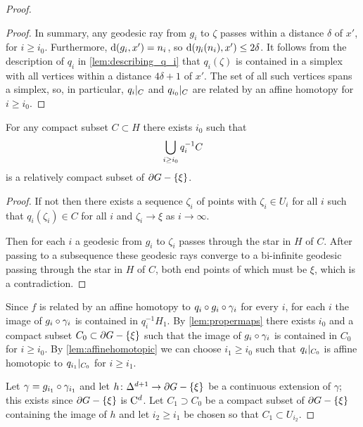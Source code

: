 \documentclass[a4paper]{article}
\begin{document}
\begin{proof}
\begin{proof}
  In summary, any geodesic ray from $g_i$ to $\zeta$ passes within a distance 
  $\delta$ of $x'$, for $i\geq i_0$. Furthermore, $\operatorname{d}(g_i,x') = n_i$, so 
  $\operatorname{d}(\eta_i(n_i), x')\leq 2\delta$. It follows from the description of
  $q_i$ in \cref{lem:describing_q_i} that $q_i(\zeta)$ is contained in a
  simplex with all vertices within a distance $4\delta+1$ of $x'$. The set of
  all such vertices spans a simplex, so, in particular, $q_i\vert_{C}$ and
  $q_{i_0}\vert_{C}$ are related by an affine homotopy for $i \geq i_0$. 
\end{proof}

\begin{lemma}\label{lem:propermaps} 
  For any compact subset $C \subset H$ there exists $i_0$ such that
  \begin{align*}
    \bigcup_{i\geq i_0} q_i^{-1} C
  \end{align*}
  is a relatively compact subset of $\partial G - \left\{\xi\right\}$.
\end{lemma}

\begin{proof}
  If not then there exists a sequence $\zeta_i$ of points with $\zeta_i \in U_i$ 
  for all $i$ such that $q_i(\zeta_i) \in C$ for all $i$ and $\zeta_i \to \xi$ 
  as $i \to \infty$.

  Then for each $i$ a geodesic from $g_i$ to $\zeta_i$ passes through the star 
  in $H$ of $C$.  After passing to a subsequence these geodesic rays converge to 
  a bi-infinite geodesic passing through the star in $H$ of $C$, both end points 
  of which must be $\xi$, which is a contradiction.
\end{proof}

Since $f$ is related by an affine homotopy to $q_i\circ g_i\circ
\gamma_i$ for every $i$, for each $i$ the image of $g_i\circ\gamma_i$ is
contained in $q_i^{-1} H_1$. By \cref{lem:propermaps} there exists $i_0$ and a
compact subset $C_0 \subset \partial G - \left\{\xi\right\}$ such that the image of
$g_i\circ\gamma_i$ is contained in $C_0$ for $i\geq i_0$. By
\cref{lem:affinehomotopic} we can choose $i_1 \geq i_0$ such that
$q_i\vert_{C_0}$ is affine homotopic to $q_{i_1}\vert_{C_0}$ for
$i\geq i_1$. 

Let $\gamma = g_{i_1}\circ\gamma_{i_1}$ and let $h \colon
\Delta^{d+1}\to\partial G - \left\{\xi\right\}$ be a continuous extension of $\gamma$;
this exists since $\partial G - \left\{\xi\right\}$ is $\mathrm{C}^{d}$. Let $C_1 \supset C_0$ be
a compact subset of $\partial G - \left\{\xi\right\}$ containing the image of $h$ and let
$i_2 \geq i_1$ be chosen so that $C_1 \subset U_{i_2}$.


\end{proof}
\end{document}
